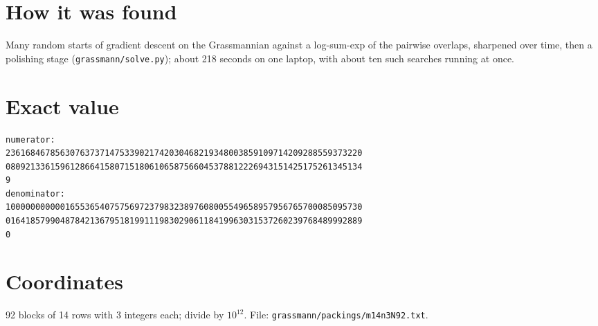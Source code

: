 \documentclass[11pt,a4paper]{article}
\begin{document}
\section{How it was found}
Many random starts of gradient descent on the Grassmannian against a log-sum-exp of the pairwise overlaps, sharpened over time, then a polishing stage (\texttt{grassmann/solve.py}); about 218 seconds on one laptop, with about ten such searches running at once.


\appendix
\section{Exact value}
{\small
\begin{verbatim}
numerator:
236168467856307637371475339021742030468219348003859109714209288559373220
080921336159612866415807151806106587566045378812226943151425175261345134
9
denominator:
100000000000165536540757569723798323897608005549658957956765700085095730
016418579904878421367951819911198302906118419963031537260239768489992889
0
\end{verbatim}}

\section{Coordinates}
92 blocks of 14 rows with 3 integers each; divide by $10^{12}$. File: \texttt{grassmann/packings/m14n3N92.txt}.
{\tiny
\begin{multicols}{3}
\end{multicols}}
\end{document}
